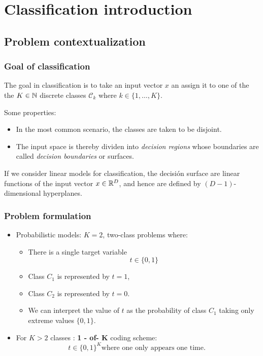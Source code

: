 \section{Classification introduction}

\subsection{Problem contextualization}
\begin{frame}
    \frametitle{Goal of classification}

    The goal in classification is to take an input vector $x$ an 
    assign it to one of the the $K \in \mathbb{N}$ discrete classes 
    $\mathcal{C}_k$ where $k \in \{1, \ldots, K\}.$

    Some properties: 

    \begin{itemize}
        \item In the most common scenario, the classes are taken to be disjoint. 
        \item The input space is thereby dividen into \textit{decision regions} whose boundaries are called \textit{decision boundaries} or surfaces. 
    \end{itemize}
    If we consider linear models for classification, the decisión surface are linear functions of the input vector $x \in \mathbb{R}^D$, 
    and hence are defined by $(D-1)$-dimensional hyperplanes.      

\end{frame}

\begin{frame}
    \frametitle{Problem formulation}

    \begin{itemize}
        \item Probabilistic models: $K = 2$, two-class problems where: 
        \begin{itemize}
            \item There is a single target variable 
            $$t \in \{0,1\}$$ 
            \item Class $C_1$ is represented by $t= 1$,
            \item Class $C_2$ is represented by $t= 0$. 
            \item We can interpret the value of $t$ as the probability of class $C_1$ taking only extreme values $\{0,1\}$.
        \end{itemize}

        \item For $K > 2$ classes : \textbf{1 - of- K} coding scheme: 
        $$t \in \{0,1\}^{K} \text{where one only appears one time. }$$
    \end{itemize}
\end{frame}

